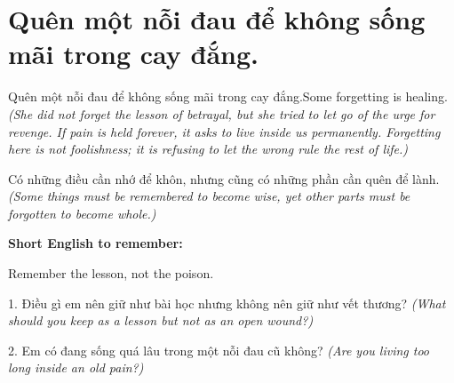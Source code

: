 \section{Quên một nỗi đau để không sống mãi trong cay đắng.}
\begin{truyen}{Quên một nỗi đau để không sống mãi trong cay đắng.}{Some forgetting is healing.}
\textit{(She did not forget the lesson of betrayal, but she tried to let go of the urge for revenge. If pain is held forever, it asks to live inside us permanently. Forgetting here is not foolishness; it is refusing to let the wrong rule the rest of life.)}
\end{truyen}
\begin{baihoc}
Có những điều cần nhớ để khôn, nhưng cũng có những phần cần quên để lành.
\textit{(Some things must be remembered to become wise, yet other parts must be forgotten to become whole.)}
\end{baihoc}
\begin{ghinhoanh}
\textbf{Short English to remember:}

Remember the lesson, not the poison.
\end{ghinhoanh}
\begin{tuhocnhanh}
1. Điều gì em nên giữ như bài học nhưng không nên giữ như vết thương? \textit{(What should you keep as a lesson but not as an open wound?)}

2. Em có đang sống quá lâu trong một nỗi đau cũ không? \textit{(Are you living too long inside an old pain?)}
\end{tuhocnhanh}
\ngancach

